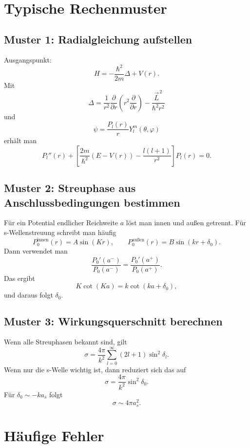 \section{Typische Rechenmuster}

\subsection{Muster 1: Radialgleichung aufstellen}

\begin{derivationbox}
Ausgangspunkt:
\[
    H=-\frac{\hbar^2}{2m}\Delta+V(r).
\]
Mit
\[
    \Delta=\frac{1}{r^2}\frac{\partial}{\partial r}\left(r^2\frac{\partial}{\partial r}\right)-\frac{\vec L^{\,2}}{\hbar^2r^2}
\]
und
\[
    \psi=\frac{P_l(r)}{r}Y_l^m(\theta,\varphi)
\]
erhält man
\[
    P_l''(r)+\left[\frac{2m}{\hbar^2}(E-V(r))-\frac{l(l+1)}{r^2}\right]P_l(r)=0.
\]
\end{derivationbox}

\subsection{Muster 2: Streuphase aus Anschlussbedingungen bestimmen}

\begin{derivationbox}
Für ein Potential endlicher Reichweite \(a\) löst man innen und außen getrennt. Für s-Wellenstreuung schreibt man häufig
\[
    P_0^{\mathrm{innen}}(r)=A\sin(Kr),
    \qquad
    P_0^{\mathrm{außen}}(r)=B\sin(kr+\delta_0).
\]
Dann verwendet man
\[
    \frac{P_0'(a^-)}{P_0(a^-)}=\frac{P_0'(a^+)}{P_0(a^+)}.
\]
Das ergibt
\[
    K\cot(Ka)=k\cot(ka+\delta_0),
\]
und daraus folgt \(\delta_0\).
\end{derivationbox}

\subsection{Muster 3: Wirkungsquerschnitt berechnen}

\begin{derivationbox}
Wenn alle Streuphasen bekannt sind, gilt
\[
    \sigma=\frac{4\pi}{k^2}\sum_{l=0}^{\infty}(2l+1)\sin^2\delta_l.
\]
Wenn nur die s-Welle wichtig ist, dann reduziert sich das auf
\[
    \sigma=\frac{4\pi}{k^2}\sin^2\delta_0.
\]
Für \(\delta_0\sim -ka_s\) folgt
\[
    \sigma\sim 4\pi a_s^2.
\]
\end{derivationbox}

\section{Häufige Fehler}

